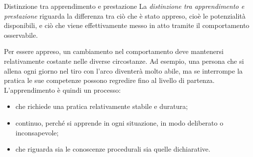 \documentclass[a4paper]{article}
\begin{document}
\begin{snippetdefinition}{Distinzione tra apprendimento e prestazione}
    La \emph{distinzione tra apprendimento e prestazione} riguarda la differenza tra ciò che è stato appreso, cioè le potenzialità disponibili, e ciò che viene effettivamente messo in atto tramite il comportamento osservabile.
\end{snippetdefinition}
Per essere appreso, un cambiamento nel comportamento deve mantenersi relativamente costante nelle diverse circostanze. Ad esempio, una persona che si allena ogni giorno nel tiro con l'arco diventerà molto abile, ma se interrompe la pratica le sue competenze possono regredire fino al livello di partenza.
L'apprendimento è quindi un processo:
\begin{itemize}
    \item che richiede una pratica relativamente stabile e duratura;
    \item continuo, perché si apprende in ogni situazione, in modo deliberato o inconsapevole;
    \item che riguarda sia le conoscenze procedurali sia quelle dichiarative.
\end{itemize}
\end{document}
